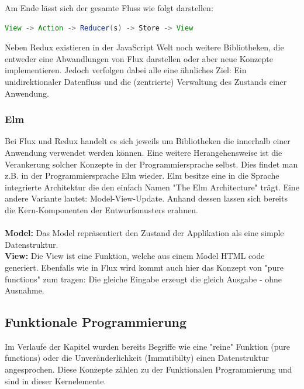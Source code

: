 Am Ende lässt sich der gesamte Fluss wie folgt darstellen:
\\
\begin{lstlisting}[frame=single, language=Java]
View -> Action -> Reducer(s) -> Store -> View
\end{lstlisting}
\bigskip
Neben Redux existieren in der JavaScript Welt noch weitere Bibliotheken, die entweder eine Abwandlungen von Flux darstellen oder aber neue Konzepte implementieren. Jedoch verfolgen dabei alle eine ähnliches Ziel: Ein unidirektionaler Datenfluss und die (zentrierte) Verwaltung des Zustands einer Anwendung.

\subsubsection{Elm}
Bei Flux und Redux handelt es sich jeweils um Bibliotheken die innerhalb einer Anwendung verwendet werden können. Eine weitere Herangehensweise ist die Verankerung solcher Konzepte in der Programmiersprache selbst. Dies findet man z.B. in
der Programmiersprache Elm
\cite{elmIntroduction}
wieder. Elm besitze eine in die Sprache integrierte Architektur die den einfach Namen "The Elm Architecture" 
\cite{theElmArchitecture}
trägt. Eine andere Variante lautet: Model-View-Update. Anhand dessen lassen sich bereits die Kern-Komponenten der Entwurfsmusters erahnen.
\\
\\
\textbf{Model:} Das Model repräsentiert den Zustand der Applikation als eine simple Datenstruktur.
\\
\textbf{View:} Die View ist eine Funktion, welche aus einem Model HTML code generiert. Ebenfalls wie in Flux wird kommt auch hier das Konzept von "pure functions" zum tragen: Die gleiche Eingabe erzeugt die gleich Ausgabe - ohne Ausnahme.
\subsection{Funktionale Programmierung}
Im Verlaufe der Kapitel wurden bereits Begriffe wie eine "reine" Funktion (pure functions) oder die Unveränderlichkeit (Immutibilty) einen Datenstruktur angesprochen. Diese Konzepte zählen zu der Funktionalen Programmierung und sind in dieser Kernelemente.